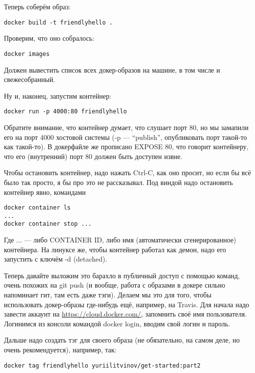 \documentclass[a5paper]{article}
\begin{document}
Теперь соберём образ:

\begin{verbatim}
docker build -t friendlyhello .
\end{verbatim}

Проверим, что оно собралось:
\begin{verbatim}
docker images
\end{verbatim}

Должен вывестить список всех докер-образов на машине, в том числе и свежесобранный.

Ну и, наконец, запустим контейнер:

\begin{verbatim}
docker run -p 4000:80 friendlyhello
\end{verbatim}

Обратите внимание, что контейнер думает, что слушает порт 80, но мы замапили его на порт 4000 хостовой системы (-p --- ``publish'', опубликовать порт такой-то как такой-то).
В докерфайле же прописано EXPOSE 80, что говорит контейнеру, что его (внутренний) порт 80 должен быть доступен извне.

Чтобы остановить контейнер, надо нажать Ctrl-C, как оно просит, но если бы всё было так просто, я бы про это не рассказывал. Под виндой надо остановить контейнер явно, командами

\begin{verbatim}
docker container ls
...
docker container stop ...
\end{verbatim}
	
Где ... --- либо CONTAINER ID, либо имя (автоматически сгенерированное) контейнера. На линуксе же, чтобы контейнер работал как демон, надо его запустить с ключём -d (detached).

Теперь давайте выложим это барахло в публичный доступ с помощью команд, очень похожих на git push (и вообще, работа с образами в докере сильно напоминает гит, там есть даже тэги).
Делаем мы это для того, чтобы использовать докер-образы где-нибудь ещё, например, на Travis. Для начала надо завести аккаунт на \url{https://cloud.docker.com/}, запомнить своё
имя пользователя. Логинимся из консоли командой docker login, вводим свой логин и пароль.

Дальше надо создать тэг для своего образа (не обязательно, на самом деле, но очень рекомендуется), например, так:

\begin{verbatim}
docker tag friendlyhello yuriilitvinov/get-started:part2
\end{verbatim}
\end{document}
